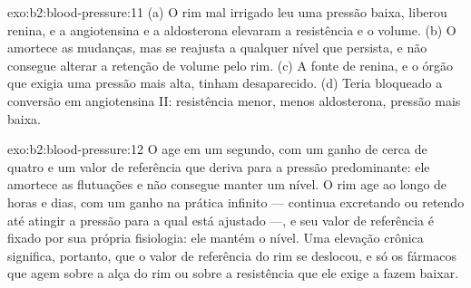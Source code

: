 \begin{solution}{exo:b2:blood-pressure:11}
(a) O rim mal irrigado leu uma pressão baixa, liberou renina, e a
angiotensina e a aldosterona elevaram a resistência e o volume. (b) O
 amortece as mudanças, mas se reajusta a qualquer nível que
persista, e não consegue alterar a retenção de volume pelo rim. (c) A
fonte de renina, e o órgão que exigia uma pressão mais alta, tinham
desaparecido. (d) Teria bloqueado a conversão em angiotensina II:
resistência menor, menos aldosterona, pressão mais baixa.
\end{solution}

\begin{solution}{exo:b2:blood-pressure:12}
O  age em um segundo, com um ganho de cerca de quatro e um
valor de referência que deriva para a pressão predominante: ele
amortece as flutuações e não consegue manter um nível. O rim age ao
longo de horas e dias, com um ganho na prática infinito --- continua
excretando ou retendo até atingir a pressão para a qual está ajustado
---, e seu valor de referência é fixado por sua própria fisiologia: ele
mantém o nível. Uma elevação crônica significa, portanto, que o valor
de referência do rim se deslocou, e só os fármacos que agem sobre a alça
do rim ou sobre a resistência que ele exige a fazem baixar.
\end{solution}

